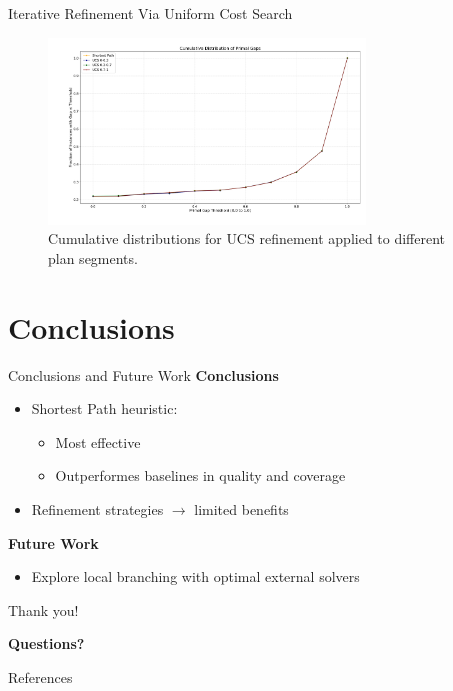 \documentclass[aspectratio=169,xcolor=dvipsnames]{beamer}
\begin{document}
\begin{frame}{Iterative Refinement Via Uniform Cost Search}
	\begin{figure}[ht]
		\centering
		\includegraphics[width=0.75\textwidth]{../thesis/images/ucs_3_intervals.png}
		\caption{Cumulative distributions for \textsc{UCS} refinement applied to different plan segments.}
		\label{fig:ucs_3intervals}
	\end{figure}
\end{frame}

\section{Conclusions}

\begin{frame}{Conclusions and Future Work}
	\textbf{Conclusions}
	\begin{itemize}
		\item Shortest Path heuristic:
		      \begin{itemize}
			      \item Most effective
			      \item Outperformes baselines in quality and coverage
		      \end{itemize}
		\item Refinement strategies $\rightarrow$ limited benefits
	\end{itemize}
	\textbf{Future Work}
	\begin{itemize}
		\item Explore local branching with optimal external solvers
	\end{itemize}
\end{frame}


\begin{frame}{Thank you!}
	\Huge{\centerline{\textbf{Questions?}}}
\end{frame}


\begin{frame}{References}
	\footnotesize
	
	
\end{frame}

\end{document}
